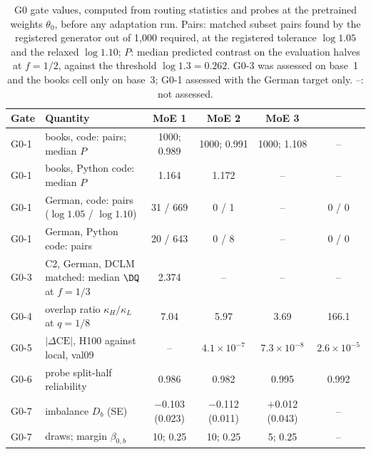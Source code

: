 \begin{table}[t]
\centering
\caption{G0 gate values, computed from routing statistics and probes at the pretrained weights $\theta_0$, before any adaptation run. Pairs: matched subset pairs found by the registered generator out of 1,000 required, at the registered tolerance $\log1.05$ and the relaxed $\log1.10$; $P$: median predicted contrast on the evaluation halves at $f=1/2$, against the threshold $\log1.3=0.262$. G0-3 was assessed on base~1 and the books cell only on base~3; G0-1 assessed \nestor{} with the German target only. --: not assessed.}
\label{tab:g0}
\footnotesize
\setlength{\tabcolsep}{4pt}
\begin{tabularx}{\linewidth}{@{}l>{\raggedright\arraybackslash}Xcccc@{}}
\toprule
Gate & Quantity & MoE 1 & MoE 2 & MoE 3 & \nestor{}\\
\midrule
G0-1 & books, code: pairs; median $P$ & 1000; 0.989 & 1000; 0.991 & 1000; 1.108 & --\\
G0-1 & books, Python code: median $P$ & 1.164 & 1.172 & -- & --\\
G0-1 & German, code: pairs ($\log1.05$ / $\log1.10$) & 31 / 669 & 0 / 1 & -- & 0 / 0\\
G0-1 & German, Python code: pairs & 20 / 643 & 0 / 8 & -- & 0 / 0\\
G0-3 & C2, German, DCLM matched: median $\DQ$ at $f=1/3$ & 2.374 & -- & -- & --\\
G0-4 & overlap ratio $\kappa_H/\kappa_L$ at $q=1/8$ & 7.04 & 5.97 & 3.69 & 166.1\\
G0-5 & $|\Delta\mathrm{CE}|$, H100 against local, val09 & -- & $4.1\times10^{-7}$ & $7.3\times10^{-8}$ & $2.6\times10^{-5}$\\
G0-6 & probe split-half reliability & 0.986 & 0.982 & 0.995 & 0.992\\
G0-7 & imbalance $D_b$ (SE) & $-$0.103 (0.023) & $-$0.112 (0.011) & $+$0.012 (0.043) & --\\
G0-7 & draws; margin $\beta_{0,b}$ & 10; 0.25 & 10; 0.25 & 5; 0.25 & --\\
\bottomrule
\end{tabularx}
\end{table}
